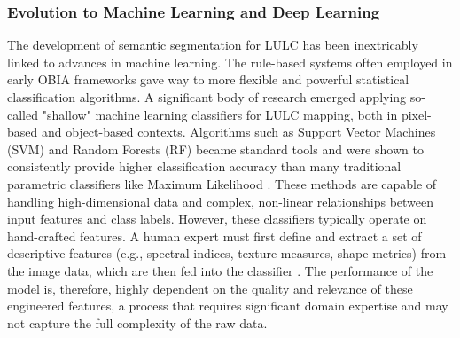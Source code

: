 \documentclass{report}
\begin{document}
\subsubsection{Evolution to Machine Learning and Deep Learning} \label{Evolution to Machine Learning and Deep Learning}
The development of semantic segmentation for LULC has been inextricably linked to advances in machine learning. The rule-based systems often employed in early OBIA frameworks gave way to more flexible and powerful statistical classification algorithms. A significant body of research emerged applying so-called "shallow" machine learning classifiers for LULC mapping, both in pixel-based and object-based contexts. Algorithms such as Support Vector Machines (SVM) and Random Forests (RF) became standard tools and were shown to consistently provide higher classification accuracy than many traditional parametric classifiers like Maximum Likelihood \parencites[p.~2, 17]{TalukdarEtAlLandUseLandCoverClassificationMachineLearningClassifiersSatelliteObservationsReview2020}. These methods are capable of handling high-dimensional data and complex, non-linear relationships between input features and class labels. However, these classifiers typically operate on hand-crafted features. A human expert must first define and extract a set of descriptive features (e.g., spectral indices, texture measures, shape metrics) from the image data, which are then fed into the classifier \parencites[p.~2f.]{NeupaneEtAlDeepLearningBasedSemanticSegmentationUrbanFeaturesSatelliteImagesReviewMetaAnalysis2021}. The performance of the model is, therefore, highly dependent on the quality and relevance of these engineered features, a process that requires significant domain expertise and may not capture the full complexity of the raw data. \par
\end{document}
